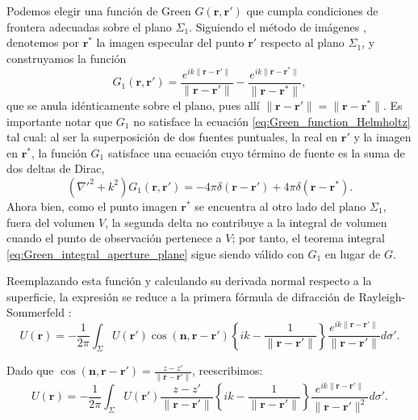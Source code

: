 \documentclass[12pt,a4paper]{article}
\numberwithin{equation}{section}
\begin{document}
Podemos elegir una función de Green $G(\mathbf{r}, \mathbf{r}')$ que cumpla condiciones de frontera adecuadas sobre el plano $\Sigma_1$. Siguiendo el método de imágenes \cite{jackson1999, goodman2005}, denotemos por $\mathbf{r}^*$ la imagen especular del punto $\mathbf{r}'$ respecto al plano $\Sigma_1$, y construyamos la función
\begin{equation}
G_1(\mathbf{r},\mathbf{r}') = \frac{e^{ik\|\mathbf{r}-\mathbf{r}'\|}}{\|\mathbf{r}-\mathbf{r}'\|} - \frac{e^{ik\|\mathbf{r}-\mathbf{r}^*\|}}{\|\mathbf{r}-\mathbf{r}^*\|},
\label{eq:Green_image_function}
\end{equation}
que se anula idénticamente sobre el plano, pues allí $\|\mathbf{r}-\mathbf{r}'\| = \|\mathbf{r}-\mathbf{r}^*\|$. Es importante notar que $G_1$ no satisface la ecuación \eqref{eq:Green_function_Helmholtz} tal cual: al ser la superposición de dos fuentes puntuales, la real en $\mathbf{r}'$ y la imagen en $\mathbf{r}^*$, la función $G_1$ satisface una ecuación cuyo término de fuente es la suma de dos deltas de Dirac,
\begin{equation}
\left(\nabla'^2+k^2\right)G_1(\mathbf{r},\mathbf{r}')
=
-4\pi\delta(\mathbf{r}-\mathbf{r}')
+4\pi\delta(\mathbf{r}-\mathbf{r}^*).
\label{eq:Green_image_two_deltas}
\end{equation}
Ahora bien, como el punto imagen $\mathbf{r}^*$ se encuentra al otro lado del plano $\Sigma_1$, fuera del volumen $V$, la segunda delta no contribuye a la integral de volumen cuando el punto de observación pertenece a $V$; por tanto, el teorema integral \eqref{eq:Green_integral_aperture_plane} sigue siendo válido con $G_1$ en lugar de $G$.

Reemplazando esta función y calculando su derivada normal respecto a la superficie, la expresión se reduce a la primera fórmula de difracción de Rayleigh-Sommerfeld \cite{goodman2005}:
\begin{equation}
U(\mathbf{r}) = -\frac{1}{2\pi} \int_{\Sigma} U(\mathbf{r}') \cos(\mathbf{n}, \mathbf{r}-\mathbf{r}') \left\{ ik - \frac{1}{\|\mathbf{r}-\mathbf{r}'\|} \right\} \frac{e^{ik\|\mathbf{r}-\mathbf{r}'\|}}{\|\mathbf{r}-\mathbf{r}'\|} d\sigma'.
\end{equation}

Dado que $\cos(\mathbf{n}, \mathbf{r}-\mathbf{r}') = \frac{z-z'}{\|\mathbf{r}-\mathbf{r}'\|}$, reescribimos:
\begin{equation}
U(\mathbf{r}) = -\frac{1}{2\pi} \int_{\Sigma} U(\mathbf{r}') \frac{z-z'}{\|\mathbf{r}-\mathbf{r}'\|} \left\{ ik - \frac{1}{\|\mathbf{r}-\mathbf{r}'\|} \right\} \frac{e^{ik\|\mathbf{r}-\mathbf{r}'\|}}{\|\mathbf{r}-\mathbf{r}'\|^2} d\sigma'.
\end{equation}
\end{document}
